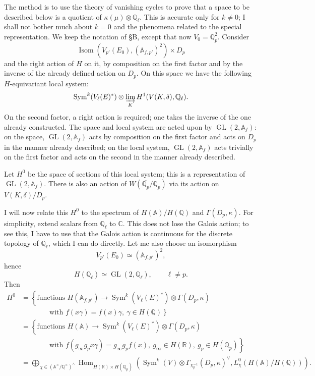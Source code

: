 \documentclass[11pt]{article}
\newcommand{\Q}{\mathbb{Q}}
\newcommand{\C}{\mathbb{C}}
\newcommand{\Qp}{\mathbb{Q}_{p}}
\newcommand{\Ql}{\mathbb{Q}_{\ell}}
\newcommand{\Af}{\mathbb{A}_{f}}
\newcommand{\Afp}{\mathbb{A}_{f,p'}}
\newcommand{\Hom}{\operatorname{Hom}}
\newcommand{\Isom}{\operatorname{Isom}}
\newcommand{\GL}{\operatorname{GL}}
\newcommand{\Sym}{\operatorname{Sym}}
\newcommand{\Lim}{\varinjlim}
\begin{document}
The method is to use the theory of vanishing cycles to prove that a space to be described below is a quotient of \(\kappa(\mu)\otimes\Ql\). This is accurate only for \(k\neq0\); I shall not bother much about \(k=0\) and the phenomena related to the special representation. We keep the notation of \S B, except that now \(V_0=\Qp^2\). Consider
\[
\Isom\!\left(V_{p'}(E_0),(\Afp)^2\right)\times D_p
\]
and the right action of \(H\) on it, by composition on the first factor and by the inverse of the already defined action on \(D_p\). On this space we have the following \(H\)-equivariant local system:
\[
\Sym^k(V_{\ell}(E)^*)\otimes \Lim_K H^1(V(K,\delta),\Ql).
\]
On the second factor, a right action is required; one takes the inverse of the one already constructed. The space and local system are acted upon by \(\GL(2,\Af)\): on the space, \(\GL(2,\Af)\) acts by composition on the first factor and acts on \(D_p\) in the manner already described; on the local system, \(\GL(2,\Af)\) acts trivially on the first factor and acts on the second in the manner already described.

Let \(H^0\) be the space of sections of this local system; this is a representation of \(\GL(2,\Af)\). There is also an action of \(W(\overline{\Qp}/\Qp)\) via its action on \(V(K,\delta)/D_p\).

I will now relate this \(H^0\) to the spectrum of \(H(\mathbb A)/H(\Q)\) and \(\Gamma(D_p,\kappa)\). For simplicity, extend scalars from \(\Ql\) to \(\C\). This does not lose the Galois action; to see this, I have to use that the Galois action is continuous for the discrete topology of \(\overline{\Ql}\), which I can do directly. Let me also choose an isomorphism
\[
V_{p'}(E_0)\simeq(\Afp)^2,
\]
hence
\[
H(\Ql)\simeq\GL(2,\Ql),\qquad \ell\neq p.
\]
Then
\[
\begin{aligned}
H^0
&=\left\{\text{functions }H(\Afp)\to
\Sym^k(V_{\ell}(E)^*)\otimes\Gamma(D_p,\kappa)\right.\\
&\hspace{4em}\left.\text{with }f(x\gamma)=f(x)\gamma,\ \gamma\in H(\Q)\right\}\\
&=\left\{\text{functions }H(\mathbb A)\to
\Sym^k(V_{\ell}(E)^*)\otimes\Gamma(D_p,\kappa)\right.\\
&\hspace{4em}\left.\text{with }f(g_{\infty}g_px\gamma)=g_{\infty}g_pf(x),\
g_{\infty}\in H(\mathbb R),\ g_p\in H(\Qp)\right\}\\
&=\bigoplus_{\chi\in(\mathbb A^{\times}/\Q^{\times})^\wedge}
\Hom_{H(\mathbb R)\times H(\Qp)}
\left(
\Sym^k(V)\otimes\Gamma_{\chi_p^{-1}}(D_p,\kappa)^{\vee},
L_{\chi}^{0}(H(\mathbb A)/H(\Q))
\right).
\end{aligned}
\]
\end{document}
